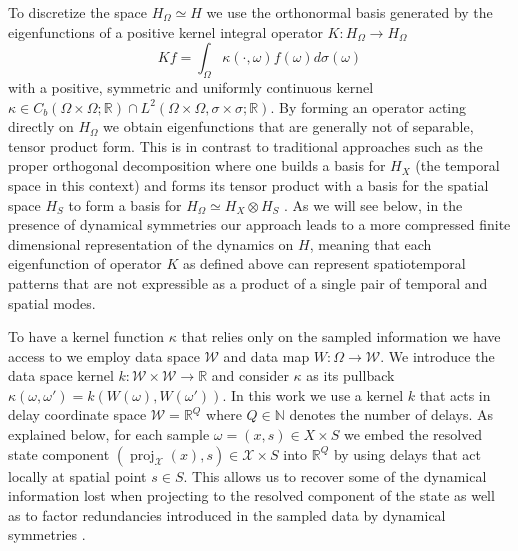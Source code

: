 \documentclass[letterpaper,10pt,3p,preprint]{elsarticle}
\newcommand{\Nbb}{\mathbb{N}}
\newcommand{\Rbb}{\mathbb{R}}
\newcommand{\Xcal}{\mathcal{X}}
\DeclareMathOperator{\proj}{proj}
\begin{document}
To discretize the space $H_\Omega\simeq H$ we use the orthonormal
basis generated by the eigenfunctions of a positive kernel
integral operator
$K\colon H_\Omega\rightarrow H_\Omega$
\begin{equation}\label{eq:integral-op}
    Kf=\int_\Omega \kappa(\cdot,\omega)f(\omega)d\sigma(\omega)
\end{equation}
with a positive, symmetric and uniformly continuous kernel
$\kappa\in C_b(\Omega\times\Omega;\Rbb)\cap
L^2(\Omega\times\Omega,\sigma\times\sigma;\Rbb)$.
By forming an operator acting directly on $H_\Omega$ we obtain
eigenfunctions that are generally not of separable, tensor product
form.
This is in contrast to traditional approaches such as the
proper orthogonal decomposition where one builds a basis
for $H_X$ (the temporal space in this context)
and forms its tensor product with a basis for the
spatial space $H_S$ to form a basis for
$H_\Omega\simeq H_X\otimes H_S$
\cite{Aubry1991}.
As we will see below, in the presence of dynamical symmetries
our approach leads to a more compressed finite dimensional
representation of the dynamics on $H$,
meaning that each eigenfunction of operator $K$
as defined above can represent spatiotemporal patterns that
are not expressible as a product of a single pair of temporal
and spatial modes.

To have a kernel function $\kappa$ that relies only on the
sampled information we have access to we employ data space
$\mathcal{W}$ and data map $W\colon\Omega\to\mathcal{W}$.
We introduce the data space kernel
$k\colon\mathcal{W}\times\mathcal{W}\to\Rbb$
and consider $\kappa$ as its pullback
$\kappa(\omega,\omega')=k(W(\omega),W(\omega'))$.
In this work we use a kernel $k$ that acts in delay coordinate space
$\mathcal{W}=\Rbb^Q$
where $Q\in\Nbb$ denotes the number of delays.
As explained below, for each sample
$\omega=(x,s)\in X\times S$
we embed the resolved state component
$(\proj_\Xcal(x),s)\in\Xcal\times S$ into $\Rbb^Q$
by using delays that act locally at spatial point $s\in S$.
This allows us to recover some of the dynamical information lost when
projecting to the resolved component of the state
as well as to factor redundancies introduced in the sampled data
by dynamical symmetries
\cite{Giannakis2019vsa}.
\end{document}
